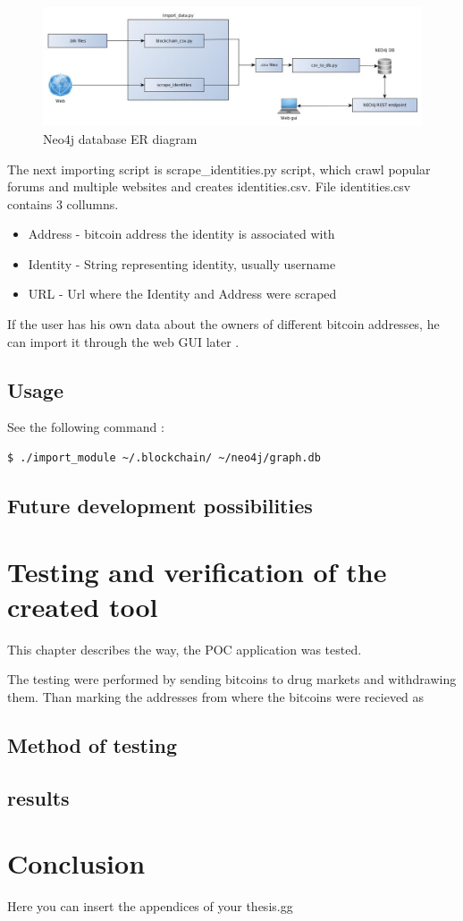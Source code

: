 \documentclass[
  digital, %
  table,   %
  lof,     %
  lot,     %
  oneside
]{fithesis3}
\begin{document}
\begin{figure}[!htb]
    \centering
    \includegraphics[width=1\textwidth]{application_architecture}
    \caption{Neo4j database ER diagram}
    \label{application_architecture}
\end{figure}

The next importing script is scrape\_identities.py script, which crawl popular forums and multiple websites and creates 
identities.csv.
File identities.csv contains 3 collumns.
\begin{itemize}
  \item Address - bitcoin address the identity is associated with
  \item Identity - String representing identity, usually username
  \item URL - Url where the Identity and Address were scraped
\end{itemize}

If the user has his own data about the owners of different bitcoin addresses, he can import it through the web GUI later
.


\section{Usage}

\noindent See the following command :
\begin{lstlisting}[language=bash]
  $ ./import_module ~/.blockchain/ ~/neo4j/graph.db
\end{lstlisting}

\section{Future development possibilities}


\chapter{Testing and verification of the created tool}
This chapter describes the way, the POC application was tested.

The testing were performed by sending bitcoins to drug markets and withdrawing them.
Than marking the addresses from where the bitcoins were recieved as 

\section{Method of testing}
\section{results}



\chapter{Conclusion}

Here you can insert the appendices of your thesis.gg

\printbibliography
\end{document}
